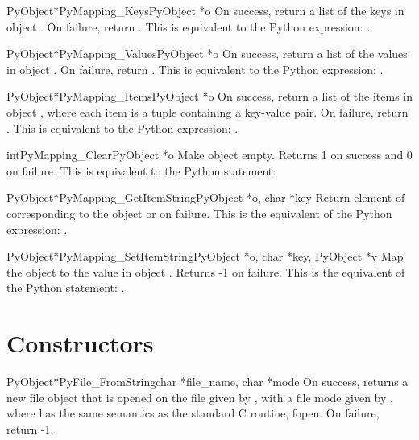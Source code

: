 \begin{cfuncdesc}{PyObject*}{PyMapping_Keys}{PyObject *o}
On success, return a list of the keys in object .  On
failure, return \NULL{}. This is equivalent to the Python
expression: .
\end{cfuncdesc}


\begin{cfuncdesc}{PyObject*}{PyMapping_Values}{PyObject *o}
On success, return a list of the values in object .  On
failure, return \NULL{}. This is equivalent to the Python
expression: .
\end{cfuncdesc}


\begin{cfuncdesc}{PyObject*}{PyMapping_Items}{PyObject *o}
On success, return a list of the items in object , where
each item is a tuple containing a key-value pair.  On
failure, return \NULL{}. This is equivalent to the Python
expression: .
\end{cfuncdesc}

\begin{cfuncdesc}{int}{PyMapping_Clear}{PyObject *o}
Make object  empty.  Returns 1 on success and 0 on failure.
This is equivalent to the Python statement:
\end{cfuncdesc}


\begin{cfuncdesc}{PyObject*}{PyMapping_GetItemString}{PyObject *o, char *key}
Return element of  corresponding to the object  or \NULL{}
on failure. This is the equivalent of the Python expression:
.
\end{cfuncdesc}

\begin{cfuncdesc}{PyObject*}{PyMapping_SetItemString}{PyObject *o, char *key, PyObject *v}
Map the object  to the value  in object .  Returns 
-1 on failure.  This is the equivalent of the Python
statement: .
\end{cfuncdesc}


\section{Constructors}

\begin{cfuncdesc}{PyObject*}{PyFile_FromString}{char *file_name, char *mode}
On success, returns a new file object that is opened on the
file given by , with a file mode given by ,
where  has the same semantics as the standard C routine,
fopen.  On failure, return -1.
\end{cfuncdesc}

